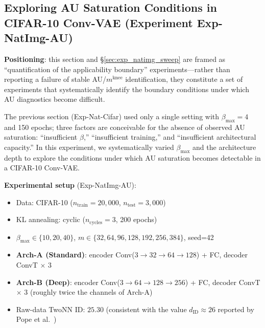 \documentclass[make,article,submit,pdftex,moreauthors]{Definitions/mdpi}
\newcommand{\mknee}{m^{\mathrm{knee}}}
\begin{document}
\subsection{Exploring AU Saturation Conditions in CIFAR-10 Conv-VAE (Experiment Exp-NatImg-AU)}\label{sec:exp_natimg_au}

\textbf{Positioning}: this section and \S\ref{sec:exp_natimg_sweep} are framed
as ``quantification of the applicability boundary'' experiments---rather than
reporting a failure of stable AU/$\mknee$ identification, they constitute a
set of experiments that systematically identify the boundary conditions under
which AU diagnostics become difficult.

The previous section (Exp-Nat-Cifar) used only a single setting with
$\beta_{\max}=4$ and 150 epochs; three factors are conceivable for the absence
of observed AU saturation: ``insufficient $\beta$,'' ``insufficient training,''
and ``insufficient architectural capacity.''
In this experiment, we systematically varied $\beta_{\max}$ and the
architecture depth to explore the conditions under which AU saturation becomes
detectable in a CIFAR-10 Conv-VAE.

\textbf{Experimental setup} (Exp-NatImg-AU):
\begin{itemize}
  \item Data: CIFAR-10 ($n_{\mathrm{train}}=20{,}000$, $n_{\mathrm{test}}=3{,}000$)
  \item KL annealing: cyclic ($n_{\mathrm{cycles}}=3$, 200 epochs)
  \item $\beta_{\max} \in \{10, 20, 40\}$, $m \in \{32, 64, 96, 128, 192, 256, 384\}$, seed=42
  \item \textbf{Arch-A (Standard)}: encoder Conv($3{\to}32{\to}64{\to}128$) + FC, decoder ConvT $\times$ 3
  \item \textbf{Arch-B (Deep)}: encoder Conv($3{\to}64{\to}128{\to}256$) + FC, decoder ConvT $\times$ 3 (roughly twice the channels of Arch-A)
  \item Raw-data TwoNN ID: $25.30$ (consistent with the value $d_\mathrm{ID} \approx 26$ reported by Pope et al.~\cite{pope2021intrinsic})
\end{itemize}
\end{document}
